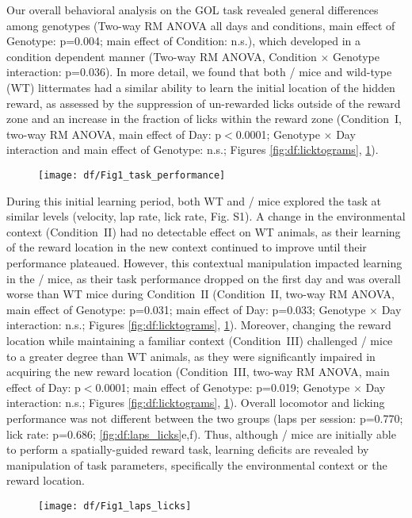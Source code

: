Our overall behavioral analysis on the GOL task revealed general differences among genotypes (Two-way RM ANOVA all days and conditions, main effect of Genotype: p=0.004; main effect of Condition: n.s.), which developed in a condition dependent manner (Two-way RM ANOVA, Condition $\times$ Genotype interaction: p=0.036). In more detail, we found that both \df/ mice and wild-type (WT) littermates had a similar ability to learn the initial location of the hidden reward, as assessed by the suppression of un-rewarded licks outside of the reward zone and an increase in the fraction of licks within the reward zone (Condition~I, two-way RM ANOVA, main effect of Day: p$<$0.0001; Genotype $\times$ Day interaction and main effect of Genotype: n.s.; Figures \ref{fig:df:licktograms}, \ref{fig:df:task_performance}).
\begin{figure}
	\centering
	\texttt{[image: df/Fig1\_task\_performance]}
	\caption{}
	\label{fig:df:task_performance}
\end{figure}
During this initial learning period, both WT and \df/ mice explored the task at similar levels (velocity, lap rate, lick rate, Fig. S1). A change in the environmental context (Condition~II) had no detectable effect on WT animals, as their learning of the reward location in the new context continued to improve until their performance plateaued. However, this contextual manipulation impacted learning in the \df/ mice, as their task performance dropped on the first day and was overall worse than WT mice during Condition~II (Condition~II, two-way RM ANOVA, main effect of Genotype: p=0.031; main effect of Day: p=0.033; Genotype $\times$ Day interaction: n.s.; Figures \ref{fig:df:licktograms}, \ref{fig:df:task_performance}). Moreover, changing the reward location while maintaining a familiar context (Condition~III) challenged \df/ mice to a greater degree than WT animals, as they were significantly impaired in acquiring the new reward location (Condition~III, two-way RM ANOVA, main effect of Day: p$<$0.0001; main effect of Genotype: p=0.019; Genotype $\times$ Day interaction: n.s.; Figures \ref{fig:df:licktograms}, \ref{fig:df:task_performance}). Overall locomotor and licking performance was not different between the two groups (laps per session: p=0.770; lick rate: p=0.686; \autoref{fig:df:laps_licks}e,f). Thus, although \df/ mice are initially able to perform a spatially-guided reward task, learning deficits are revealed by manipulation of task parameters, specifically the environmental context or the reward location.
\begin{figure}
	\centering
	\texttt{[image: df/Fig1\_laps\_licks]}
	\caption{}
	\label{fig:df:laps_licks}
\end{figure}

